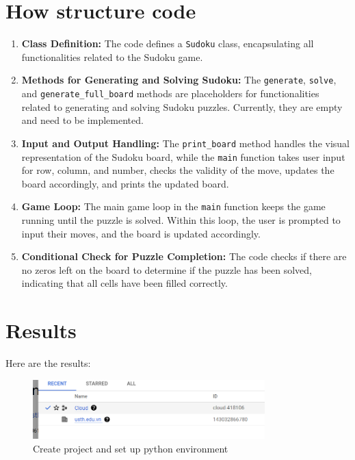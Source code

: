 \documentclass{article}
\begin{document}
\section{How structure code}
\begin{enumerate}
    \item \textbf{Class Definition:} The code defines a \texttt{Sudoku} class, encapsulating all functionalities related to the Sudoku game.
    
    \item \textbf{Methods for Generating and Solving Sudoku:} The \texttt{generate}, \texttt{solve}, and \texttt{generate\_full\_board} methods are placeholders for functionalities related to generating and solving Sudoku puzzles. Currently, they are empty and need to be implemented.
    
    \item \textbf{Input and Output Handling:} The \texttt{print\_board} method handles the visual representation of the Sudoku board, while the \texttt{main} function takes user input for row, column, and number, checks the validity of the move, updates the board accordingly, and prints the updated board.
    
    \item \textbf{Game Loop:} The main game loop in the \texttt{main} function keeps the game running until the puzzle is solved. Within this loop, the user is prompted to input their moves, and the board is updated accordingly.
    
    \item \textbf{Conditional Check for Puzzle Completion:} The code checks if there are no zeros left on the board to determine if the puzzle has been solved, indicating that all cells have been filled correctly.
\end{enumerate}

\section{Results}

Here are the results:

\begin{figure}[h]
  \centering
  \includegraphics[width=0.8\textwidth]{create_prj.png}
  \caption{Create project and set up python environment}
\end{figure}
\end{document}
